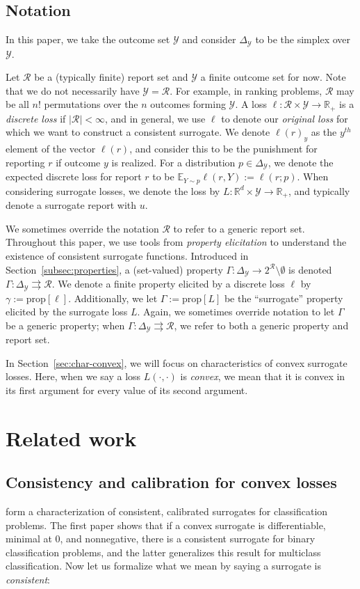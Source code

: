\documentclass{article}
\newcommand{\reals}{\mathbb{R}}
\newcommand{\simplex}{\Delta_\Y}
\newcommand{\prop}[1]{\mathrm{prop}[#1]}
\newcommand{\E}{\mathbb{E}}
\newcommand{\R}{\mathcal{R}}
\newcommand{\Y}{\mathcal{Y}}
\newcommand{\toto}{\rightrightarrows}
\begin{document}
\subsection{Notation}
In this paper, we take the outcome set $\Y$ and consider $\simplex$ to be the simplex over $\Y$.

Let $\R$ be a (typically finite) report set and $\Y$ a finite outcome set for now.
Note that we do not necessarily have $\Y = \R$.  
For example, in ranking problems, $\R$ may be all $n!$ permutations over the $n$ outcomes forming $\Y$.
A loss $\ell : \R \times \Y \to \reals_+$ is a \emph{discrete loss} if $|\R| < \infty$, and in general, we use $\ell$ to denote our \emph{original loss} for which we want to construct a consistent surrogate.
We denote $\ell(r)_y$ as the $y^{th}$ element of the vector $\ell(r)$, and consider this to be the punishment for reporting $r$ if outcome $y$ is realized.
For a distribution $p \in \simplex$, we denote the expected discrete loss for report $r$ to be $\E_{Y \sim p} \ell(r, Y) := \ell(r; p)$.
When considering surrogate losses, we denote the loss by $L : \reals^d \times \Y \to \reals_+$, and typically denote a surrogate report with $u$.

We sometimes override the notation $\R$ to refer to a generic report set.
Throughout this paper, we use tools from \emph{property elicitation} to understand the existence of consistent surrogate functions.
Introduced in Section~\ref{subsec:properties}, a (set-valued) property $\Gamma: \simplex \to 2^\R \setminus \emptyset$ is denoted $\Gamma:\simplex \toto \R$.
We denote a finite property elicited by a discrete loss $\ell$ by $\gamma := \prop{\ell}$.
Additionally, we let $\Gamma := \prop{L}$ be the ``surrogate'' property elicited by the surrogate loss $L$.
Again, we sometimes override notation to let $\Gamma$ be a generic property; when $\Gamma: \simplex \toto \R$, we refer to both a generic property and report set.

In Section~\ref{sec:char-convex}, we will focus on characteristics of convex surrogate losses.
Here, when we say a loss $L(\cdot, \cdot)$ is \emph{convex}, we mean that it is convex in its first argument for every value of its second argument.

\section{Related work}\label{sec:related-work}
\subsection{Consistency and calibration for convex losses}\label{subsec:convex-surrogates}
\cite{bartlett2006convexity,tewari2007consistency} form a characterization of consistent, calibrated surrogates for classification problems.
The first paper shows that if a convex surrogate is differentiable, minimal at $0$, and nonnegative, there is a consistent surrogate for binary classification problems, and the latter generalizes this result for multiclass classification.
Now let us formalize what we mean by saying a surrogate is \emph{consistent}:
\end{document}
